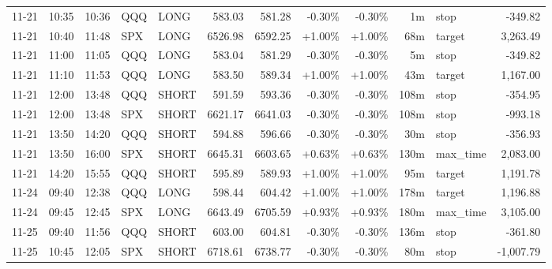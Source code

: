 \documentclass[11pt,a4paper,twoside]{article}
\begin{document}
\begin{center}
\begin{longtable}{>{\color{txtmain}}l l l l l r r r r r >{\color{txtmain}}l r}
11-21 & 10:35 & 10:36 & QQQ & LONG & 583.03 & 581.28 & \textcolor{lossred}{-0.30\%} & \textcolor{lossred}{-0.30\%} & 1m & stop & \textcolor{lossred}{-349.82} \\
11-21 & 10:40 & 11:48 & SPX & LONG & 6526.98 & 6592.25 & \textcolor{wingreen}{+1.00\%} & \textcolor{wingreen}{+1.00\%} & 68m & target & \textcolor{wingreen}{3,263.49} \\
11-21 & 11:00 & 11:05 & QQQ & LONG & 583.04 & 581.29 & \textcolor{lossred}{-0.30\%} & \textcolor{lossred}{-0.30\%} & 5m & stop & \textcolor{lossred}{-349.82} \\
11-21 & 11:10 & 11:53 & QQQ & LONG & 583.50 & 589.34 & \textcolor{wingreen}{+1.00\%} & \textcolor{wingreen}{+1.00\%} & 43m & target & \textcolor{wingreen}{1,167.00} \\
11-21 & 12:00 & 13:48 & QQQ & SHORT & 591.59 & 593.36 & \textcolor{lossred}{-0.30\%} & \textcolor{lossred}{-0.30\%} & 108m & stop & \textcolor{lossred}{-354.95} \\
11-21 & 12:00 & 13:48 & SPX & SHORT & 6621.17 & 6641.03 & \textcolor{lossred}{-0.30\%} & \textcolor{lossred}{-0.30\%} & 108m & stop & \textcolor{lossred}{-993.18} \\
11-21 & 13:50 & 14:20 & QQQ & SHORT & 594.88 & 596.66 & \textcolor{lossred}{-0.30\%} & \textcolor{lossred}{-0.30\%} & 30m & stop & \textcolor{lossred}{-356.93} \\
11-21 & 13:50 & 16:00 & SPX & SHORT & 6645.31 & 6603.65 & \textcolor{wingreen}{+0.63\%} & \textcolor{wingreen}{+0.63\%} & 130m & max\_time & \textcolor{wingreen}{2,083.00} \\
11-21 & 14:20 & 15:55 & QQQ & SHORT & 595.89 & 589.93 & \textcolor{wingreen}{+1.00\%} & \textcolor{wingreen}{+1.00\%} & 95m & target & \textcolor{wingreen}{1,191.78} \\
11-24 & 09:40 & 12:38 & QQQ & LONG & 598.44 & 604.42 & \textcolor{wingreen}{+1.00\%} & \textcolor{wingreen}{+1.00\%} & 178m & target & \textcolor{wingreen}{1,196.88} \\
11-24 & 09:45 & 12:45 & SPX & LONG & 6643.49 & 6705.59 & \textcolor{wingreen}{+0.93\%} & \textcolor{wingreen}{+0.93\%} & 180m & max\_time & \textcolor{wingreen}{3,105.00} \\
11-25 & 09:40 & 11:56 & QQQ & SHORT & 603.00 & 604.81 & \textcolor{lossred}{-0.30\%} & \textcolor{lossred}{-0.30\%} & 136m & stop & \textcolor{lossred}{-361.80} \\
11-25 & 10:45 & 12:05 & SPX & SHORT & 6718.61 & 6738.77 & \textcolor{lossred}{-0.30\%} & \textcolor{lossred}{-0.30\%} & 80m & stop & \textcolor{lossred}{-1,007.79} \\

\end{longtable}
\end{center}
\end{document}
